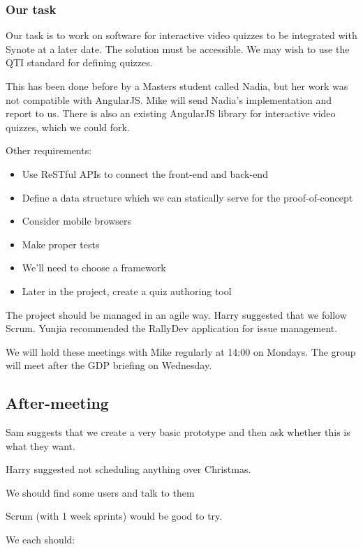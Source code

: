 \subsubsection{Our task}

Our task is to work on software for interactive video quizzes to be
integrated with Synote at a later date. The solution must be accessible.
We may wish to use the \gls{QTI} standard for defining quizzes.

This has been done before by a Masters student called Nadia, but her
work was not compatible with AngularJS. Mike will send Nadia's
implementation and report to us. There is also an existing AngularJS
library for interactive video quizzes, which we could fork.

Other requirements:

\begin{itemize}
\itemsep1pt\parskip0pt
\item
  Use ReSTful \glspl{API} to connect the front-end and back-end
\item
  Define a data structure which we can statically serve for the proof-of-concept
\item
  Consider mobile browsers
\item
  Make proper tests
\item
  We'll need to choose a framework
\item
  Later in the project, create a quiz authoring tool
\end{itemize}

The project should be managed in an agile way. Harry suggested that we
follow Scrum. Yunjia recommended the RallyDev application for issue
management.

We will hold these meetings with Mike regularly at 14:00 on Mondays. The
group will meet after the GDP briefing on Wednesday.

\subsection{After-meeting}

Sam suggests that we create a very basic prototype and then ask whether
this is what they want.

Harry suggested not scheduling anything over Christmas.

We should find some users and talk to them

Scrum (with 1 week sprints) would be good to try.

We each should:

